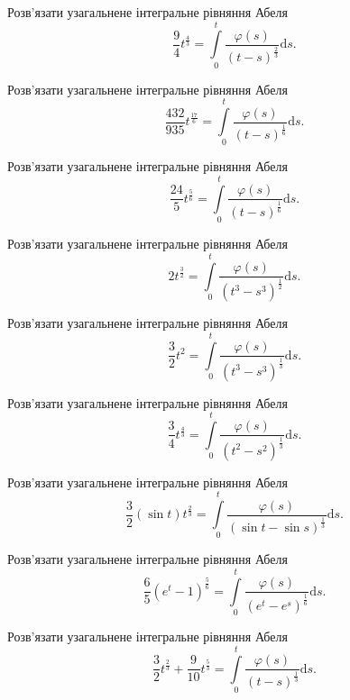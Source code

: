 \documentclass[12pt]{extarticle}
\begin{document}
\begin{Exercise}
Розв’язати узагальнене інтегральне рівняння Абеля \[\dfrac{9}{4} t^{\frac{4}{3}} = \int\limits_{0}^{t} \dfrac{\varphi(s)}{(t-s)^{\frac{2}{3}}} \mathrm{d}s.\]
\end{Exercise}

\begin{Exercise}
Розв’язати узагальнене інтегральне рівняння Абеля \[\dfrac{432}{935} t^{\frac{17}{6}} = \int\limits_{0}^{t} \dfrac{\varphi(s)}{(t-s)^{\frac{1}{6}}} \mathrm{d}s.\]
\end{Exercise}

\begin{Exercise}
Розв’язати узагальнене інтегральне рівняння Абеля \[\dfrac{24}{5} t^{\frac{5}{6}} = \int\limits_{0}^{t} \dfrac{\varphi(s)}{(t-s)^{\frac{1}{6}}} \mathrm{d}s.\]
\end{Exercise}

\begin{Exercise}
Розв’язати узагальнене інтегральне рівняння Абеля \[2 t^{\frac{3}{2}} = \int\limits_{0}^{t} \dfrac{\varphi(s)}{(t^3-s^3)^{\frac{1}{2}}} \mathrm{d}s.\]
\end{Exercise}

\begin{Exercise}
Розв’язати узагальнене інтегральне рівняння Абеля \[\dfrac{3}{2} t^2 = \int\limits_{0}^{t} \dfrac{\varphi(s)}{(t^3-s^3)^{\frac{1}{3}}} \mathrm{d}s.\]
\end{Exercise}

\begin{Exercise}
Розв’язати узагальнене інтегральне рівняння Абеля \[\dfrac{3}{4} t^{\frac{4}{3}} = \int\limits_{0}^{t} \dfrac{\varphi(s)}{(t^2-s^2)^{\frac{1}{3}}} \mathrm{d}s.\]
\end{Exercise}

\begin{Exercise}
Розв’язати узагальнене інтегральне рівняння Абеля \[\dfrac{3}{2} (\sin t)t^{\frac{2}{3}} = \int\limits_{0}^{t} \dfrac{\varphi(s)}{(\sin t- \sin s)^{\frac{1}{3}}} \mathrm{d}s.\]
\end{Exercise}

\begin{Exercise}
Розв’язати узагальнене інтегральне рівняння Абеля \[\dfrac{6}{5} \left(e^t - 1\right)^{\frac{5}{6}} = \int\limits_{0}^{t} \dfrac{\varphi(s)}{\left(e^t-e^s\right)^{\frac{1}{6}}} \mathrm{d}s.\]
\end{Exercise}

\begin{Exercise}
Розв’язати узагальнене інтегральне рівняння Абеля \[\dfrac{3}{2} t^{\frac{2}{3}} + \dfrac{9}{10} t^{\frac{5}{3}} = \int\limits_{0}^{t} \dfrac{\varphi(s)}{(t-s)^{\frac{1}{3}}} \mathrm{d}s.\]
\end{Exercise}
\end{document}
